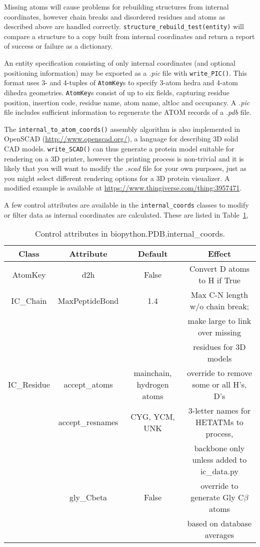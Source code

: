 Missing atoms will cause problems for rebuilding structures from internal coordinates, however chain breaks and
disordered residues and atoms as described above are handled correctly.  \texttt{structure\_rebuild\_test(entity)}  
will compare a structure to a copy built from internal coordinates and return a report of success or failure as
a dictionary.

An entity specification consisting of only internal coordinates (and optional positioning information) may be exported
as a \emph{.pic} file with \texttt{write\_PIC()}.  This format uses 3- and 4-tuples of \texttt{AtomKey}s to specify 3-atom
hedra and 4-atom dihedra geometries.  \texttt{AtomKey}s consist of up to six fields, capturing residue position, insertion 
code, residue name, atom name, altloc and occupancy.  A \emph{.pic} file includes sufficient information to regenerate the
ATOM records of a \emph{.pdb} file.

The \texttt{internal\_to\_atom\_coords()} assembly algorithm is also implemented in OpenSCAD (\url{http://www.openscad.org/}),
a language for describing 3D solid CAD models.  \texttt{write\_SCAD()} can thus generate a protein model suitable for rendering 
on a 3D printer, however the printing process is non-trivial and it is likely that you will want to modify the \emph{.scad} file 
for your own purposes, just as you might select different rendering options for a 3D protein visualizer.  A modified example 
is available at \url{https://www.thingiverse.com/thing:3957471}.

A few control attributes are available in the \texttt{internal\_coords} classes to modify or filter data as internal coordinates are calculated.  These are listed in Table~\ref{table:ic-attribs},

\begin{table}
	\begin{tabular}{|c|c|c|c|}
		\hline
		Class&Attribute&Default&Effect\\
		\hline
		\hline
		AtomKey&d2h&False&Convert D atoms to H if True\\
		\hline
		IC\_Chain&MaxPeptideBond&1.4&Max C-N length w/o chain break; \\
		& & & make large to link over missing \\
		& & & residues for 3D models \\
		\hline
		IC\_Residue&accept\_atoms&mainchain, hydrogen atoms&override to remove some or all H's, D's\\
		\hline
		&accept\_resnames&CYG, YCM, UNK&3-letter names for HETATMs to process, \\
		& & & backbone only unless added to ic\_data.py \\
		\hline
		&gly\_Cbeta&False&override to generate Gly C$\beta$ atoms \\
		& & & based on database averages \\
		\hline
	\end{tabular}
	\caption{Control attributes in biopython.PDB.internal\_coords.}
	\label{table:ic-attribs}
\end{table}

